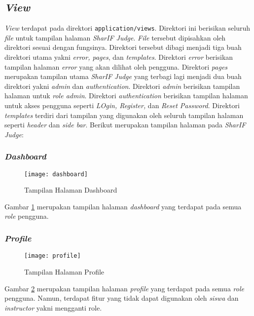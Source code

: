 \subsection{\textit{View}}
\textit{View} terdapat pada direktori \texttt{application/views}. Direktori ini berisikan seluruh \textit{file} untuk tampilan halaman \textit{SharIF Judge}. \textit{File} tersebut dipisahkan oleh direktori sesuai dengan fungsinya. Direktori tersebut dibagi menjadi tiga buah direktori utama yakni \textit{error, pages}, dan \textit{templates}. Direktori \textit{error} berisikan tampilan halaman \textit{error} yang akan dilihat oleh pengguna. Direktori \textit{pages} merupakan tampilan utama \textit{SharIF Judge} yang terbagi lagi menjadi dua buah direktori yakni \textit{admin} dan \textit{authentication}. Direktori \textit{admin} berisikan tampilan halaman untuk \textit{role admin}. Direktori \textit{authentication} berisikan tampilan halaman untuk akses pengguna seperti \textit{LOgin, Register,} dan \textit{Reset Password}. Direktori \textit{templates} terdiri dari tampilan yang digunakan oleh seluruh tampilan halaman seperti \textit{header} dan \textit{side bar}. Berikut merupakan tampilan halaman pada \textit{SharIF Judge}:

\subsubsection{\textit{Dashboard}}
\begin{figure}[H]
	\centering  
	\texttt{[image: dashboard]}  
	\caption[Tampilan Halaman \textit{Dashboard}]{Tampilan Halaman Dashboard} 
	\label{fig:dashboard} 
\end{figure} 

Gambar \ref{fig:dashboard} merupakan tampilan halaman \textit{dashboard} yang terdapat pada semua \textit{role} pengguna.
\subsubsection{\textit{Profile}}
\begin{figure}[H]
	\centering  
	\texttt{[image: profile]}  
	\caption[Tampilan Halaman \textit{Profile}]{Tampilan Halaman Profile} 
	\label{fig:profile} 
\end{figure}

Gambar \ref{fig:profile} merupakan tampilan halaman \textit{profile} yang terdapat pada semua \textit{role} pengguna. Namun, terdapat fitur yang tidak dapat digunakan oleh \textit{siswa} dan \textit{instructor} yakni mengganti role.

